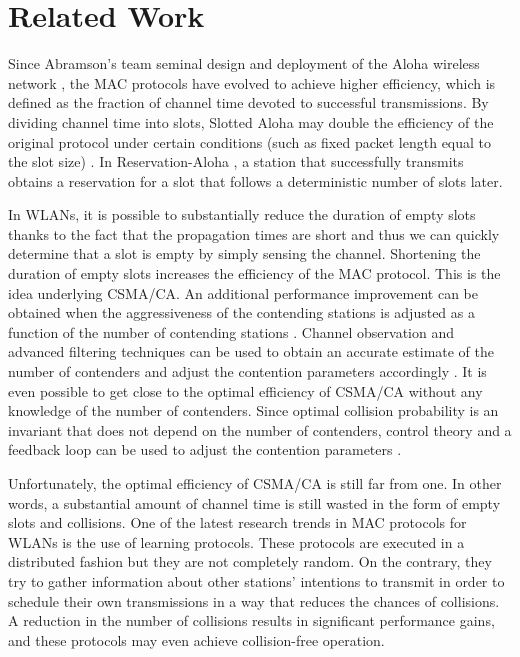 \documentclass[journal]{IEEEtran}
\begin{document}
\section{Related Work}
\label{sec:related_work}
Since Abramson's team seminal design and deployment of the Aloha wireless network \cite{abramson1970asa,abramson2009asw}, the MAC protocols have evolved to achieve higher efficiency, which is defined as the fraction of channel time devoted to successful transmissions. By dividing channel time into slots, Slotted Aloha may double the efficiency of the original protocol under certain conditions (such as fixed packet length equal to the slot size) \cite{rom1990map,roberts1975aps,tanenbaum1988cn}. In Reservation-Aloha \cite{crowther1973sbc}, a station that successfully transmits obtains a reservation for a slot that follows a deterministic number of slots later. 

In WLANs, it is possible to substantially reduce the duration of empty slots thanks to the fact that the propagation times are short and thus we can quickly determine that a slot is empty by simply sensing the channel. Shortening the duration of empty slots increases the efficiency of the MAC protocol. This is the idea underlying CSMA/CA. An additional performance improvement can be obtained when the aggressiveness of the contending stations is adjusted as a function of the number of contending stations \cite{cali2000dti}. Channel observation and advanced filtering techniques can be used to obtain an accurate estimate of the number of contenders and adjust the contention parameters accordingly \cite{toledo2006aoi}. It is even possible to get close to the optimal efficiency of CSMA/CA without any knowledge of the number of contenders. Since optimal collision probability is an invariant that does not depend on the number of contenders, control theory and a feedback loop can be used to adjust the contention parameters \cite{patras2009cta}.

Unfortunately, the optimal efficiency of CSMA/CA is still far from one. In other words, a substantial amount of channel time is still wasted in the form of empty slots and collisions. One of the latest research trends in MAC protocols for WLANs is the use of learning protocols. These protocols are executed in a distributed fashion but they are not completely random. On the contrary, they try to gather information about other stations' intentions to transmit in order to schedule their own transmissions in a way that reduces the chances of collisions. A reduction in the number of collisions results in significant performance gains, and these protocols may even achieve collision-free operation.
\end{document}
